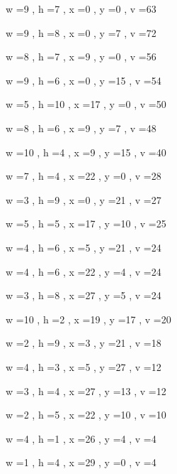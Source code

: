 \documentclass[11pt]{article}
\begin{document}
w =9 , h =7 , x =0 , y =0 , v =63
\par
w =9 , h =8 , x =0 , y =7 , v =72
\par
w =8 , h =7 , x =9 , y =0 , v =56
\par
w =9 , h =6 , x =0 , y =15 , v =54
\par
w =5 , h =10 , x =17 , y =0 , v =50
\par
w =8 , h =6 , x =9 , y =7 , v =48
\par
w =10 , h =4 , x =9 , y =15 , v =40
\par
w =7 , h =4 , x =22 , y =0 , v =28
\par
w =3 , h =9 , x =0 , y =21 , v =27
\par
w =5 , h =5 , x =17 , y =10 , v =25
\par
w =4 , h =6 , x =5 , y =21 , v =24
\par
w =4 , h =6 , x =22 , y =4 , v =24
\par
w =3 , h =8 , x =27 , y =5 , v =24
\par
w =10 , h =2 , x =19 , y =17 , v =20
\par
w =2 , h =9 , x =3 , y =21 , v =18
\par
w =4 , h =3 , x =5 , y =27 , v =12
\par
w =3 , h =4 , x =27 , y =13 , v =12
\par
w =2 , h =5 , x =22 , y =10 , v =10
\par
w =4 , h =1 , x =26 , y =4 , v =4
\par
w =1 , h =4 , x =29 , y =0 , v =4
\par
\newpage
\end{document}
